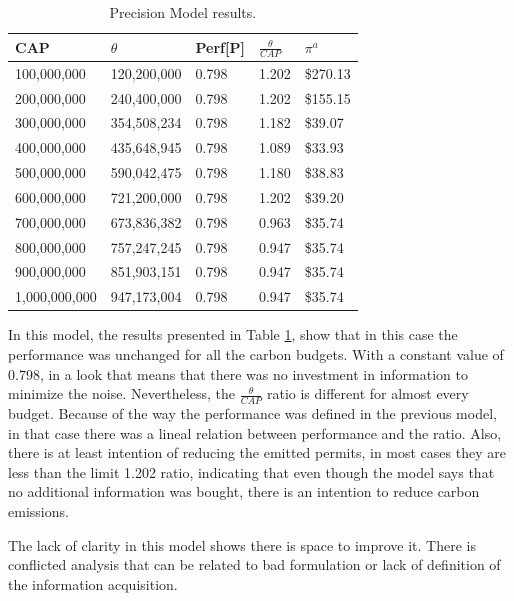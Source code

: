 \documentclass[a4paper,fleqn]{cas-dc}
\begin{document}
\begin{table}[h]
\caption{{\footnotesize Precision Model results.}}
    \label{resultadosprecision}
    \centering
    \begin{tabular}{ l l l l l }
    \hline
        CAP & $\theta$ & Perf[P] & $\frac{\theta}{CAP}$  & $\pi^a$ \\ \hline
        100,000,000 & 120,200,000  & 0.798  & 1.202  &  \$270.13   \\ \hline
        200,000,000 & 240,400,000  & 0.798  & 1.202  &  \$155.15   \\ \hline
        300,000,000 & 354,508,234  & 0.798  & 1.182  &  \$39.07   \\ \hline
        400,000,000 & 435,648,945  & 0.798  & 1.089  &  \$33.93   \\ \hline
        500,000,000 & 590,042,475  & 0.798  & 1.180  &  \$38.83   \\ \hline
        600,000,000 & 721,200,000  & 0.798  & 1.202  &  \$39.20   \\ \hline
        700,000,000 & 673,836,382  & 0.798  & 0.963  &  \$35.74   \\ \hline
        800,000,000 & 757,247,245  & 0.798  & 0.947  &  \$35.74   \\ \hline
        900,000,000 & 851,903,151  & 0.798  & 0.947  &  \$35.74   \\ \hline
        1,000,000,000 & 947,173,004  & 0.798  & 0.947  &  \$35.74   \\ \hline
    \end{tabular}
\end{table}


In this model, the results presented in Table \ref{resultadosprecision}, show that in this case the performance was unchanged for all the carbon budgets. With a constant value of 0.798, in a look that means that there was no investment in information to minimize the noise. Nevertheless, the $\frac{\theta}{CAP}$ ratio is different for almost every budget. Because of the way the performance was defined in the previous model, in that case there was a lineal relation between performance and the ratio. Also, there is at least intention of reducing the emitted permits, in most cases they are less than the limit 1.202 ratio, indicating that even though the model says that no additional information was bought, there is an intention to reduce carbon emissions.

The lack of clarity in this model shows there is space to improve it. There is conflicted analysis that can be related to bad formulation or lack of definition of the information acquisition.
\end{document}
